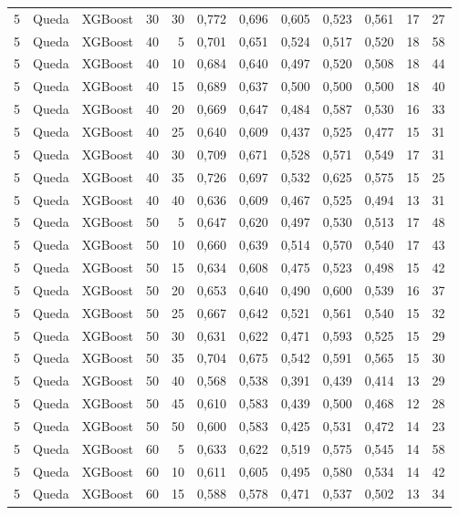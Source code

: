 \begin{longtable}{@{}rllrrrrrrrrr@{}}
5 & Queda & XGBoost & 30 & 30 & 0,772 & 0,696 & 0,605 & 0,523 & 0,561 & 17 & 27 \\
5 & Queda & XGBoost & 40 & 5 & 0,701 & 0,651 & 0,524 & 0,517 & 0,520 & 18 & 58 \\
5 & Queda & XGBoost & 40 & 10 & 0,684 & 0,640 & 0,497 & 0,520 & 0,508 & 18 & 44 \\
5 & Queda & XGBoost & 40 & 15 & 0,689 & 0,637 & 0,500 & 0,500 & 0,500 & 18 & 40 \\
5 & Queda & XGBoost & 40 & 20 & 0,669 & 0,647 & 0,484 & 0,587 & 0,530 & 16 & 33 \\
5 & Queda & XGBoost & 40 & 25 & 0,640 & 0,609 & 0,437 & 0,525 & 0,477 & 15 & 31 \\
5 & Queda & XGBoost & 40 & 30 & 0,709 & 0,671 & 0,528 & 0,571 & 0,549 & 17 & 31 \\
5 & Queda & XGBoost & 40 & 35 & 0,726 & 0,697 & 0,532 & 0,625 & 0,575 & 15 & 25 \\
5 & Queda & XGBoost & 40 & 40 & 0,636 & 0,609 & 0,467 & 0,525 & 0,494 & 13 & 31 \\
5 & Queda & XGBoost & 50 & 5 & 0,647 & 0,620 & 0,497 & 0,530 & 0,513 & 17 & 48 \\
5 & Queda & XGBoost & 50 & 10 & 0,660 & 0,639 & 0,514 & 0,570 & 0,540 & 17 & 43 \\
5 & Queda & XGBoost & 50 & 15 & 0,634 & 0,608 & 0,475 & 0,523 & 0,498 & 15 & 42 \\
5 & Queda & XGBoost & 50 & 20 & 0,653 & 0,640 & 0,490 & 0,600 & 0,539 & 16 & 37 \\
5 & Queda & XGBoost & 50 & 25 & 0,667 & 0,642 & 0,521 & 0,561 & 0,540 & 15 & 32 \\
5 & Queda & XGBoost & 50 & 30 & 0,631 & 0,622 & 0,471 & 0,593 & 0,525 & 15 & 29 \\
5 & Queda & XGBoost & 50 & 35 & 0,704 & 0,675 & 0,542 & 0,591 & 0,565 & 15 & 30 \\
5 & Queda & XGBoost & 50 & 40 & 0,568 & 0,538 & 0,391 & 0,439 & 0,414 & 13 & 29 \\
5 & Queda & XGBoost & 50 & 45 & 0,610 & 0,583 & 0,439 & 0,500 & 0,468 & 12 & 28 \\
5 & Queda & XGBoost & 50 & 50 & 0,600 & 0,583 & 0,425 & 0,531 & 0,472 & 14 & 23 \\
5 & Queda & XGBoost & 60 & 5 & 0,633 & 0,622 & 0,519 & 0,575 & 0,545 & 14 & 58 \\
5 & Queda & XGBoost & 60 & 10 & 0,611 & 0,605 & 0,495 & 0,580 & 0,534 & 14 & 42 \\
5 & Queda & XGBoost & 60 & 15 & 0,588 & 0,578 & 0,471 & 0,537 & 0,502 & 13 & 34 \\

\end{longtable}
